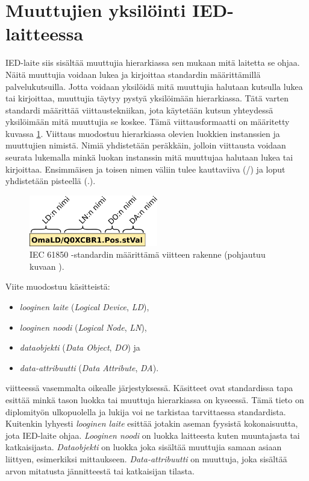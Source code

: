 \section{Muuttujien yksilöinti IED-laitteessa}
IED-laite siis sisältää muuttujia hierarkiassa sen mukaan mitä laitetta se ohjaa. Näitä muuttujia voidaan lukea ja kirjoittaa standardin määrittämillä palvelukutsuilla. Jotta voidaan yksilöidä mitä muuttujia halutaan kutsulla lukea tai kirjoittaa, muuttujia täytyy pystyä yksilöimään hierarkiassa. Tätä varten standardi määrittää viittaustekniikan, jota käytetään kutsun yhteydessä yksilöimään mitä muuttujia se koskee. Tämä viittausformaatti on määritetty kuvassa \ref{fig:iec61850-data-reference}. Viittaus muodostuu hierarkiassa olevien luokkien instanssien ja muuttujien nimistä. Nimiä yhdistetään peräkkäin, jolloin viittausta voidaan seurata lukemalla minkä luokan instanssin mitä muuttujaa halutaan lukea tai kirjoittaa. Ensimmäisen ja toisen nimen väliin tulee kauttaviiva (/) ja loput yhdistetään pisteellä (.). \mbox{\cite[s.~625--626]{Mackiewicz2006}} \mbox{\cite[s.~93--95]{IEC61850-7-1}}

\begin{figure}[ht!]
	\includegraphics[width=0.5\textwidth]{pictures/iec61850-data-reference.png}
	\caption{IEC 61850 -standardin määrittämä viitteen rakenne (pohjautuu kuvaan \mbox{\cite[s.~93]{IEC61850-7-1}}).}
	\label{fig:iec61850-data-reference}
\end{figure}

Viite muodostuu käsitteistä:
\begin{itemize}
	\item \emph{looginen laite} (\emph{Logical Device}, \emph{LD}),
	\item \emph{looginen noodi} (\emph{Logical Node}, \emph{LN}),
	\item \emph{dataobjekti} (\emph{Data Object}, \emph{DO}) ja
	\item \emph{data-attribuutti} (\emph{Data Attribute}, \emph{DA}).
\end{itemize}
viitteessä vasemmalta oikealle järjestyksessä. Käsitteet ovat standardissa tapa esittää minkä tason luokka tai muuttuja hierarkiassa on kyseessä. Tämä tieto on diplomityön ulkopuolella ja lukija voi ne tarkistaa tarvittaessa standardista. Kuitenkin lyhyesti \emph{looginen laite} esittää jotakin aseman fyysistä kokonaisuutta, jota IED-laite ohjaa. \emph{Looginen noodi} on luokka laitteesta kuten muuntajasta tai katkaisijasta. \emph{Dataobjekti} on luokka joka sisältää muuttujia samaan asiaan liittyen, esimerkiksi mittaukseen. \emph{Data-attribuutti} on muuttuja, joka sisältää arvon mitatusta jännitteestä tai katkaisijan tilasta. \mbox{\cite[s.~2]{Camachi2017}} \mbox{\cite[s.~24]{IEC61850-1}}


